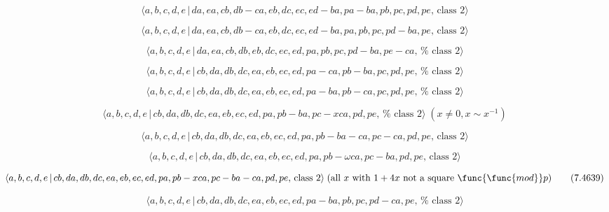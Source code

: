 \documentclass[10pt]{article}
\begin{document}
\begin{equation}
\langle a,b,c,d,e\,|\,da,ea,cb,db-ca,eb,dc,ec,ed-ba,pa-ba,pb,pc,pd,pe,\,%
\text{class }2\rangle  \tag{7.4631}
\end{equation}

\begin{equation}
\langle a,b,c,d,e\,|\,da,ea,cb,db-ca,eb,dc,ec,ed-ba,pa,pb,pc,pd-ba,pe,\,%
\text{class }2\rangle  \tag{7.4632}
\end{equation}

\begin{equation}
\langle a,b,c,d,e\,|\,da,ea,cb,db,eb,dc,ec,ed,pa,pb,pc,pd-ba,pe-ca,\,\text{%
class }2\rangle  \tag{7.4633}
\end{equation}

\begin{equation}
\langle a,b,c,d,e\,|\,cb,da,db,dc,ea,eb,ec,ed,pa-ca,pb-ba,pc,pd,pe,\,\text{%
class }2\rangle  \tag{7.4634}
\end{equation}

\begin{equation}
\langle a,b,c,d,e\,|\,cb,da,db,dc,ea,eb,ec,ed,pa-ba,pb-ca,pc,pd,pe,\,\text{%
class }2\rangle  \tag{7.4635}
\end{equation}

\begin{equation}
\langle a,b,c,d,e\,|\,cb,da,db,dc,ea,eb,ec,ed,pa,pb-ba,pc-xca,pd,pe,\,\text{%
class }2\rangle \;(x \neq 0, x \sim x^{-1})  \tag{7.4636}
\end{equation}

\begin{equation}
\langle a,b,c,d,e\,|\,cb,da,db,dc,ea,eb,ec,ed,pa,pb-ba-ca,pc-ca,pd,pe,\,%
\text{class }2\rangle  \tag{7.4637}
\end{equation}

\begin{equation}
\langle a,b,c,d,e\,|\,cb,da,db,dc,ea,eb,ec,ed,pa,pb-\omega ca,pc-ba,pd,pe,\,%
\text{class }2\rangle  \tag{7.4638}
\end{equation}

\begin{equation}
\langle a,b,c,d,e\,|\,cb,da,db,dc,ea,eb,ec,ed,pa,pb-xca,pc-ba-ca,pd,pe,\,%
\text{class }2\rangle \;(\text{all }x\text{ with }1+4x\text{ not a square }%
\func{\func{mod}}p)  \tag{7.4639}
\end{equation}

\begin{equation}
\langle a,b,c,d,e\,|\,cb,da,db,dc,ea,eb,ec,ed,pa-ba,pb,pc,pd-ca,pe,\,\text{%
class }2\rangle  \tag{7.4640}
\end{equation}
\end{document}
